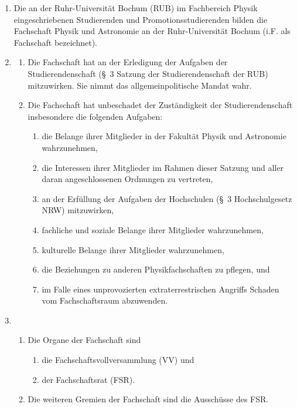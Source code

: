 \documentclass[a4paper, 12pt]{article}
\newcommand{\vv}{VV}
\newcommand{\rat}{FSR}
\newcommand{\rates}{FSR}
\begin{document}
	\begin{enumerate}[leftmargin=0cm]
		
	\item {}

	Die an der Ruhr-Universität Bochum (RUB) im Fachbereich Physik eingeschriebenen Studierenden und Promotionsstudierenden bilden die Fachschaft Physik und Astronomie an der Ruhr-Universität Bochum (i.F. als Fachschaft bezeichnet). 

	\item {}\label{AufgabenderFS}
	\begin{enumerate}[leftmargin=0cm]
	 \item Die Fachschaft hat an der Erledigung der Aufgaben der Studierendenschaft (§~3 Satzung der Studierendenschaft der RUB) mitzuwirken. Sie nimmt das allgemeinpolitische Mandat wahr.
	 \item Die Fachschaft hat unbeschadet der Zuständigkeit der Studierendenschaft insbesondere die folgenden Aufgaben: 
	
	\begin{enumerate}[leftmargin=0.5cm]
		\item die Belange ihrer Mitglieder in der Fakultät Physik und Astronomie wahrzunehmen,
		\item die Interessen ihrer Mitglieder im Rahmen dieser Satzung und aller daran angeschlossenen Ordnungen zu vertreten,
		\item an der Erfüllung der Aufgaben der Hochschulen (§~3 Hochschulgesetz NRW) mitzuwirken,
		\item fachliche und soziale Belange ihrer Mitglieder wahrzunehmen,
		\item kulturelle Belange ihrer Mitglieder wahrzunehmen,
		\item die Beziehungen zu anderen Physikfachschaften zu pflegen, und
		\item im Falle eines unprovozierten extraterrestrischen Angriffs Schaden vom Fachschaftsraum abzuwenden.\label{alienangriff}
	\end{enumerate}
	
\end{enumerate}
	
	\item {}
	\begin{enumerate}[leftmargin=0cm]
		\item Die Organe der Fachschaft sind
		\begin{enumerate}[leftmargin=0.5cm]
			\item die Fachschaftsvollversammlung (\vv) und
			\item der Fachschaftsrat (\rat).
		\end{enumerate}
		\item Die weiteren Gremien der Fachschaft sind die Ausschüsse des \rates.
	\end{enumerate}
	

\end{enumerate}
\end{document}
